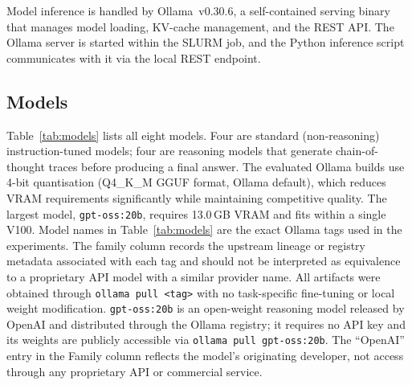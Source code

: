 \documentclass[journal]{IEEEtran}
\begin{document}
Model inference is handled by Ollama~v0.30.6, a self-contained
serving binary that manages model loading, KV-cache management,
and the REST API. The Ollama server is started within the SLURM
job, and the Python inference script communicates with it via the
local REST endpoint.

\subsection{Models}

Table~\ref{tab:models} lists all eight models. Four are standard
(non-reasoning) instruction-tuned models; four are reasoning models
that generate chain-of-thought traces before producing a final answer.
The evaluated Ollama builds use 4-bit quantisation (Q4\_K\_M GGUF
format, Ollama default), which reduces VRAM requirements significantly
while maintaining competitive quality.
The largest model, \texttt{gpt-oss:20b}, requires 13.0\,GB VRAM and
fits within a single V100.
Model names in Table~\ref{tab:models} are the exact Ollama tags used
in the experiments. The family column records the upstream lineage or
registry metadata associated with each tag and should not be interpreted
as equivalence to a proprietary API model with a similar provider name.
All artifacts were obtained through \texttt{ollama pull <tag>} with no
task-specific fine-tuning or local weight modification.
\texttt{gpt-oss:20b} is an open-weight reasoning model released by
OpenAI and distributed through the Ollama registry; it requires no API
key and its weights are publicly accessible via
\texttt{ollama pull gpt-oss:20b}.
The ``OpenAI'' entry in the Family column reflects the model's
originating developer, not access through any proprietary API or
commercial service.
\end{document}
